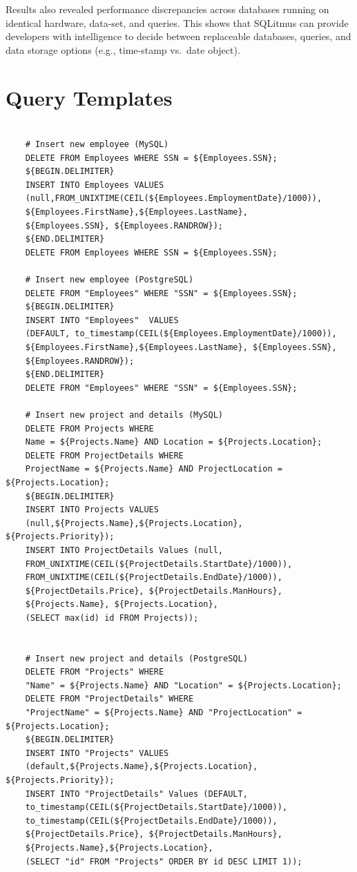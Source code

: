 \documentclass[12pt]{report}
\begin{document}
\begin{spacing}{1.9}
	Results also revealed performance discrepancies across databases running on identical hardware, data-set, and queries. This shows that SQLitmus can provide developers with intelligence to decide between replaceable databases, queries, and data storage options (e.g., time-stamp vs.\ date object).
	
	\printbibliography
	
	\appendix
	
	\chapter{Query Templates}
	
	\begin{verbatim}
	
	# Insert new employee (MySQL)
	DELETE FROM Employees WHERE SSN = ${Employees.SSN};
	${BEGIN.DELIMITER}
	INSERT INTO Employees VALUES 
	(null,FROM_UNIXTIME(CEIL(${Employees.EmploymentDate}/1000)),
	${Employees.FirstName},${Employees.LastName}, 
	${Employees.SSN}, ${Employees.RANDROW});
	${END.DELIMITER}
	DELETE FROM Employees WHERE SSN = ${Employees.SSN};
	
	# Insert new employee (PostgreSQL)
	DELETE FROM "Employees" WHERE "SSN" = ${Employees.SSN};
	${BEGIN.DELIMITER}
	INSERT INTO "Employees"  VALUES 
	(DEFAULT, to_timestamp(CEIL(${Employees.EmploymentDate}/1000)),
	${Employees.FirstName},${Employees.LastName}, ${Employees.SSN}, 
	${Employees.RANDROW});
	${END.DELIMITER}
	DELETE FROM "Employees" WHERE "SSN" = ${Employees.SSN};
	
	# Insert new project and details (MySQL)
	DELETE FROM Projects WHERE 
	Name = ${Projects.Name} AND Location = ${Projects.Location};
	DELETE FROM ProjectDetails WHERE 
	ProjectName = ${Projects.Name} AND ProjectLocation = ${Projects.Location};
	${BEGIN.DELIMITER}
	INSERT INTO Projects VALUES 
	(null,${Projects.Name},${Projects.Location}, ${Projects.Priority});
	INSERT INTO ProjectDetails Values (null, 
	FROM_UNIXTIME(CEIL(${ProjectDetails.StartDate}/1000)), 
	FROM_UNIXTIME(CEIL(${ProjectDetails.EndDate}/1000)),
	${ProjectDetails.Price}, ${ProjectDetails.ManHours}, 
	${Projects.Name}, ${Projects.Location},
	(SELECT max(id) id FROM Projects));
	
	
	# Insert new project and details (PostgreSQL)
	DELETE FROM "Projects" WHERE 
	"Name" = ${Projects.Name} AND "Location" = ${Projects.Location};
	DELETE FROM "ProjectDetails" WHERE 
	"ProjectName" = ${Projects.Name} AND "ProjectLocation" = ${Projects.Location};
	${BEGIN.DELIMITER}
	INSERT INTO "Projects" VALUES 
	(default,${Projects.Name},${Projects.Location}, ${Projects.Priority});
	INSERT INTO "ProjectDetails" Values (DEFAULT, 
	to_timestamp(CEIL(${ProjectDetails.StartDate}/1000)), 
	to_timestamp(CEIL(${ProjectDetails.EndDate}/1000)),
	${ProjectDetails.Price}, ${ProjectDetails.ManHours}, 
	${Projects.Name},${Projects.Location}, 
	(SELECT "id" FROM "Projects" ORDER BY id DESC LIMIT 1));
	

\end{verbatim}
\end{spacing}
\end{document}
